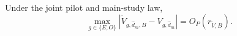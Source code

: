 Under the joint pilot and main-study law,
\[
 \max_{g\in\{E,O\}}|\widetilde V_{g,\widehat d_m,B}-V_{g,\widehat d_m}|=O_P(r_{\widetilde V,B}).
\]
